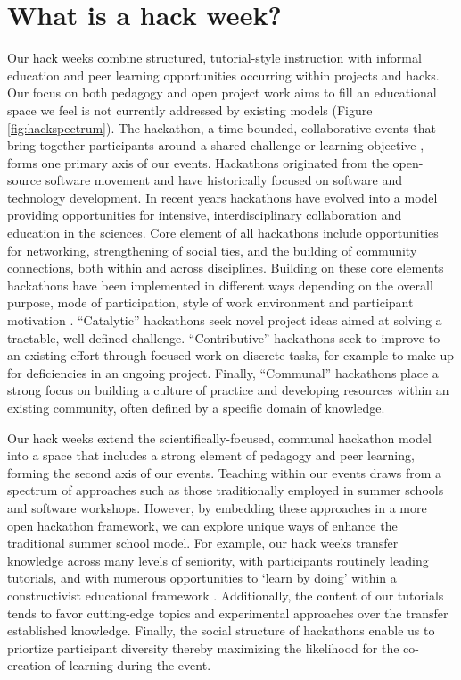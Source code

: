 \section*{What is a hack week?}

Our hack weeks combine structured, tutorial-style instruction with informal education and peer learning opportunities occurring within projects and hacks. 
Our focus on both pedagogy and open project work aims to fill an educational space we feel is not currently addressed by existing models (Figure \ref{fig:hackspectrum}). 
The hackathon, a time-bounded, collaborative events that bring together participants around a shared challenge or learning objective \cite{Decker2015}, forms one primary axis of our events. 
Hackathons originated from the open-source software movement and have historically focused on software and technology development. 
In recent years hackathons have evolved into a model providing opportunities for intensive, interdisciplinary collaboration \cite{Groen2015-cj,Moller2013-ah} and education \cite{Kienzler2015-zu,Lamers2014-xf} in the sciences. 
Core element of all hackathons include opportunities for networking, strengthening of social ties, and the building of community connections, both within and across disciplines.
Building on these core elements hackathons have been implemented in different ways depending on the overall purpose, mode of participation, style of work environment and participant motivation \cite{Drouhard2017}. 
``Catalytic'' hackathons seek novel project ideas aimed at solving a tractable, well-defined challenge.
``Contributive'' hackathons seek to improve to an existing effort through focused work on discrete tasks, for example to make up for deficiencies in an ongoing project.
Finally, ``Communal'' hackathons place a strong focus on building a culture of practice and developing resources within an existing community, often defined by a specific domain of knowledge.

Our hack weeks extend the scientifically-focused, communal hackathon model into a space that includes a strong element of pedagogy and peer learning, forming the second axis of our events. 
Teaching within our events draws from a spectrum of approaches such as those traditionally employed in summer schools and software workshops. 
However, by embedding these approaches in a more open hackathon framework, we can explore unique ways of enhance the traditional summer school model.
For example, our hack weeks transfer knowledge across many levels of seniority, with participants routinely leading tutorials, and with numerous opportunities to `learn by doing' within a constructivist educational framework \cite{Bransford2000-lu,Papert1980-fh}.
Additionally, the content of our tutorials tends to favor cutting-edge topics and experimental approaches over the transfer established knowledge. 
Finally, the social structure of hackathons enable us to priortize participant diversity thereby maximizing the likelihood for the co-creation of learning during the event. 

